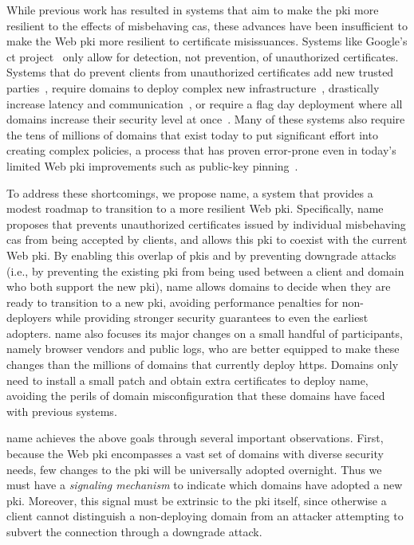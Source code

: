 While previous work has resulted in systems that aim to make the \ac{pki} more
resilient to the effects of misbehaving \acp{ca}, these advances have been
insufficient to make the Web \ac{pki} more resilient to certificate
misissuances. Systems like Google's \ac{ct} project~\cite{rfc6962} only allow
for detection, not prevention, of unauthorized certificates. Systems that do
prevent clients from unauthorized certificates add new trusted
parties~\cite{kim2013accountable}, require domains to deploy complex new
infrastructure~\cite{rfc6698, szalachowski2014policert}, drastically increase
latency and communication~\cite{yu2016dtki}, or require a flag day deployment
where all domains increase their security level at once~\cite{basin2014arpki}.
Many of these systems also require the tens of millions of domains that exist
today to put significant effort into creating complex policies, a process that
has proven error-prone even in today's limited Web \ac{pki} improvements such as
public-key pinning~\cite{palmer2017intent}.

To address these shortcomings, we propose \acs{name}, a system that provides a
modest roadmap to transition to a more resilient Web \ac{pki}. Specifically,
\ac{name} proposes  that prevents unauthorized certificates issued by
individual misbehaving \acp{ca} from being accepted by clients, and allows this
\ac{pki} to coexist with the current Web \ac{pki}. By enabling this overlap of
\acp{pki} and by preventing downgrade attacks (i.e., by preventing the existing
\ac{pki} from being used between a client and domain who both support the new
\ac{pki}), \ac{name} allows domains to decide when they are ready to transition
to a new \ac{pki}, avoiding performance penalties for non-deployers while
providing stronger security guarantees to even the earliest adopters. \ac{name}
also focuses its major changes on a small handful of participants, namely
browser vendors and public logs, who are better equipped to make these changes
than the millions of domains that currently deploy \ac{https}. Domains only need
to install a small patch and obtain extra certificates to deploy \ac{name},
avoiding the perils of domain misconfiguration that these domains have faced
with previous systems.

\ac{name} achieves the above goals through several important observations.
First, because the Web \ac{pki} encompasses a vast set of domains with diverse
security needs, few changes to the \ac{pki} will be universally adopted
overnight. Thus we must have a \emph{signaling mechanism} to indicate which
domains have adopted a new \ac{pki}. Moreover, this signal must be extrinsic to
the \ac{pki} itself, since otherwise a client cannot distinguish a non-deploying
domain from an attacker attempting to subvert the connection through a downgrade
attack.

